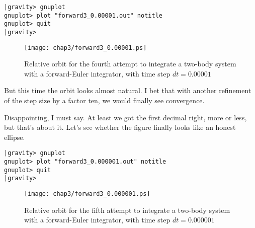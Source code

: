 \begin{small}
\begin{verbatim}
|gravity> gnuplot
gnuplot> plot "forward3_0.00001.out" notitle
gnuplot> quit
|gravity> 
\end{verbatim}
\end{small}

\begin{figure}[ht]
\centering
\texttt{[image: chap3/forward3\_0.00001.ps]}
\caption[Two-body orbit with a forward-Euler integrator, time step
$dt = 0.00001$]
{Relative orbit for the fourth attempt to integrate a two-body system with a
forward-Euler integrator, with time step $dt = 0.00001$}
\label{fig:forward3-0.00001}
\end{figure}

\abc

\carol
But this time the orbit looks almost natural.  I bet that with another
refinement of the step size by a factor ten, we would finally see
convergence.

\cba


\abc

\bob
Disappointing, I must say.  At least we got the first decimal right,
more or less, but that's about it.  Let's see whether the figure
finally looks like an honest ellipse.

\cba

\begin{small}
\begin{verbatim}
|gravity> gnuplot
gnuplot> plot "forward3_0.000001.out" notitle
gnuplot> quit
|gravity> 
\end{verbatim}
\end{small}

\begin{figure}[ht]
\centering
\texttt{[image: chap3/forward3\_0.000001.ps]}
\caption[Two-body orbit with a forward-Euler integrator, time step
$dt = 0.000001$]
{Relative orbit for the fifth attempt to integrate a two-body system with a
forward-Euler integrator, with time step $dt = 0.000001$}
\label{fig:forward3-0.000001}
\end{figure}

